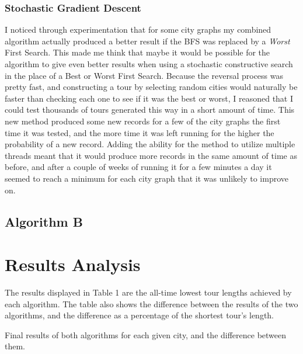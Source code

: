 \documentclass[a4paper,11pt]{article}
\begin{document}
\subsubsection{Stochastic Gradient Descent}
I noticed through experimentation that for some city graphs my combined 
algorithm actually produced a better result if the BFS was replaced by a 
\emph{Worst} First Search. This made me think that maybe it would be possible
for the algorithm to give even better results when using a stochastic
constructive search in the place of a Best or Worst First Search. Because the
reversal process was pretty fast, and constructing a tour by selecting random
cities would naturally be faster than checking each one to see if it was the
best or worst, I reasoned that I could test thousands of tours generated this
way in a short amount of time. This new method produced some new records for
a few of the city graphs the first time it was tested, and the more time it was
left running for the higher the probability of a new record. Adding the ability
for the method to utilize multiple threads meant that it would produce more
records in the same amount of time as before, and after a couple of weeks of
running it for a few minutes a day it seemed to reach a minimum for each city
graph that it was unlikely to improve on.

\subsection{Algorithm B}


\section{Results Analysis}
The results displayed in Table 1 are the all-time lowest tour lengths
achieved by each algorithm. The table also shows the difference between the
results of the two algorithms, and the difference as a percentage of the
shortest tour's length.

\begin{table}[h!]
\begin{center}

\end{center}
\caption{Final results of both algorithms for each given city, and the
	difference between them.}
\end{table}

\lipsum[1-5]
\end{document}
